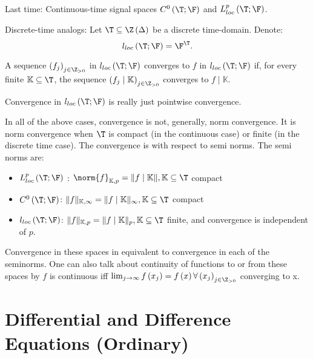 
Last time: Continuous-time signal spaces $C^{0}\left( \T;\F \right) $ and $L^{p}_{loc}\left( \T; \F \right) $. 

Discrete-time analogs: Let $\T \subseteq \Z\left( \Delta \right) $ be a discrete time-domain. Denote: 
\[
	l_{loc}\left( \T; \F \right)   = \F ^{\T}
.\] 

\begin{definition}[Convergence]	
	 A sequence $\left( f_{j} \right) _{j \in  \Z_{>0}}$ in $l _{loc}\left( \T;\F \right) $ converges to $f$ in $l_{loc}\left( \T; \F \right)$ if, for every finite $\mathbb{K} \subseteq \T$, the sequence $\left( f_{j}  \mid \mathbb{K} \right) _{j \in  \Z_{>0}}$ converges to $f  \mid \mathbb{K}$. 

\end{definition}

Convergence in $l_{loc}\left( \T; \F \right) $ is really just pointwise convergence. 
\begin{note}
	 In all of the above cases, convergence is not, generally, norm convergence. It is norm convergence when $\T$ is compact (in the continuous case) or finite (in the discrete time case). The convergence is with respect to semi norms. The semi norms are:
	\begin{itemize}
		\item $L_{loc}^{p} \left( \T; \F \right) $ : $\norm{f}_{\mathbb{K}, p} = \|f \mid \mathbb{K}\|, \mathbb{K} \subseteq \T$ compact 
		\item $C^{0} \left( \T; \F \right) $: $\|f\|_{\mathbb{K}, \infty} =  \|f \mid \mathbb{K}\| _{\infty}, \mathbb{K}\subseteq\T$ compact
		\item $l _{loc}\left( \T;\F \right) $: $\|f\|_{\mathbb{K}, p} = \|f \mid \mathbb{K}\|_{p}, \mathbb{K}\subseteq \T$ finite, and convergence is independent of $p$.
	\end{itemize}
\end{note}

Convergence in these spaces in equivalent to convergence in each of the seminorms. One can also talk about continuity of functions to or from these spaces by $f$ is continuous iff $\lim_{j \to \infty} f\left( x_{j} \right) = f\left( x \right) \forall \left( x_{j} \right) _{j \in \Z_{>0}}$ converging to x. 

\section{Differential and Difference Equations (Ordinary)}

